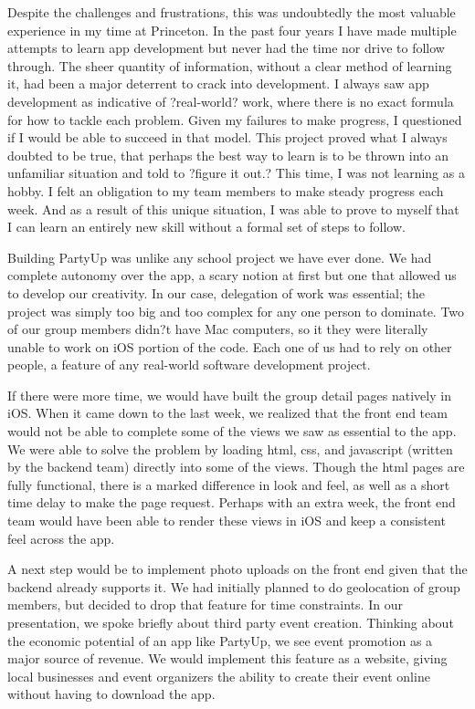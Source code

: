 \documentclass[12pt]{article}
\begin{document}
Despite the challenges and frustrations, this was undoubtedly the most valuable experience in my time at Princeton. In the past four years I have made multiple attempts to learn app development but never had the time nor drive to follow through. The sheer quantity of information, without a clear method of learning it, had been a major deterrent to crack into development. I always saw app development as indicative of ?real-world? work, where there is no exact formula for how to tackle each problem. Given my failures to make progress, I questioned if I would be able to succeed in that model. This project proved what I always doubted to be true, that perhaps the best way to learn is to be thrown into an unfamiliar situation and told to ?figure it out.? This time, I was not learning as a hobby. I felt an obligation to my team members to make steady progress each week. And as a result of this unique situation, I was able to prove to myself that I can learn an entirely new skill without a formal set of steps to follow. 

\bigskip

Building PartyUp was unlike any school project we have ever done. We had complete autonomy over the app, a scary notion at first but one that allowed us to develop our creativity. In our case, delegation of work was essential; the project was simply too big and too complex for any one person to dominate. Two of our group members didn?t have Mac computers, so it they were literally unable to work on iOS portion of the code. Each one of us had to rely on other people, a feature of any real-world software development project. 

\bigskip

If there were more time, we would have built the group detail pages natively in iOS. When it came down to the last week, we realized that the front end team would not be able to complete some of the views we saw as essential to the app. We were able to solve the problem by loading html, css, and javascript (written by the backend team) directly into some of the views. Though the html pages are fully functional, there is a marked difference in look and feel, as well as a short time delay to make the page request. Perhaps with an extra week, the front end team would have been able to render these views in iOS and keep a consistent feel across the app. 

\bigskip

A next step would be to implement photo uploads on the front end given that the backend already supports it. We had initially planned to do geolocation of group members, but decided to drop that feature for time constraints. In our presentation, we spoke briefly about third party event creation. Thinking about the economic potential of an app like PartyUp, we see event promotion as a major source of revenue. We would implement this feature as a website, giving local businesses and event organizers the ability to create their event online without having to download the app.
\end{document}
